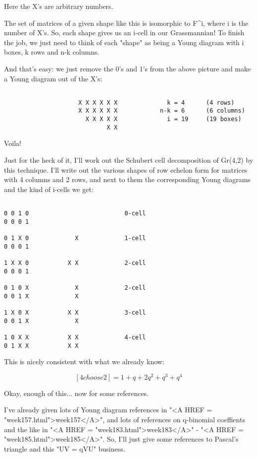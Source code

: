 Here the X's are arbitrary numbers.  


The set of matrices of a given shape like this is isomorphic to
F^{i}, where i is the number of X's.  So, each shape gives us an
i-cell in our Grassmannian!  To finish the job, we just need to think of
each "shape" as being a Young diagram with i boxes, k rows and
n-k columns.

And that's easy: we just remove the 0's and 1's from the above picture
and make a Young diagram out of the X's:
               

\begin{verbatim}

                     X X X X X X              k = 4      (4 rows)
                     X X X X X X            n-k = 6      (6 columns)
                       X X X X X              i = 19     (19 boxes)
                             X X
\end{verbatim}
    
Voila!

Just for the heck of it, I'll work out the Schubert cell decomposition
of Gr(4,2) by this technique.   I'll write out the various shapes of 
row echelon form for matrices with 4 columns and 2 rows, and next to 
them the corresponding Young diagrams and the kind of i-cells we get:


\begin{verbatim}

0 0 1 0                           0-cell
0 0 0 1         
  
0 1 X 0             X             1-cell
0 0 0 1                 

1 X X 0           X X             2-cell
0 0 0 1     

0 1 0 X             X             2-cell
0 0 1 X             X

1 X 0 X           X X             3-cell
0 0 1 X             X

1 0 X X           X X             4-cell
0 1 X X           X X

\end{verbatim}
    
This is nicely consistent with what we already know:


$$

[4 choose 2] = 1 + q + 2q^{2} + q^{3} + q^{4}
$$
    
Okay, enough of this... now for some references.  

I've already given lots of Young diagram references in "<A HREF =
"week157.html">week157</A>", and lots of references on q-binomial
coeffients and the like in "<A HREF =
"week183.html">week183</A>" - "<A HREF =
"week185.html">week185</A>".  So, I'll just give some references to
Pascal's triangle and this "UV = qVU" business.

